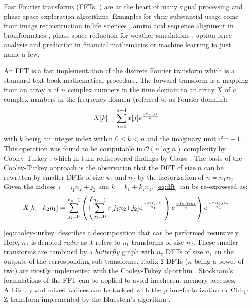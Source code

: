 Fast Fourier transforms (FFTs, \citep{van1992computational}) are at the heart of many signal processing and phase space exploration algorithms. Examples for their substantial usage come from image reconstruction in life sciences \citep{preibisch2014efficient,schmid2015real}, amino acid sequence alignment in bioinformatics \citep{katoh2002mafft}, phase space reduction for weather simulations \citep{maronga2015parallelized}, option price analysis and prediction in financial mathematics \citep{hurd2010fourier} or machine learning \citep{dlstudy} to just name a few.

An FFT is a fast implementation of the discrete Fourier transform which is a standard text-book mathematical procedure. The forward transform is a mapping from an array $x$ of $n$ complex numbers in the time domain to an array $X$ of $n$ complex numbers in the frequency domain (referred to as Fourier domain):
%
\begin{equation}
  \label{eq:dft}
  X[k] = \sum_{j=0}^{n-1} x[j]e^{\frac{-2\pi {\mathrm{i}\mkern1mu} jk}{n}}
\end{equation}
%
with $k$ being an integer index within $0 \le k < n$ and the imaginary unit ${\mathrm{i}\mkern1mu}^2{=}-1$. This operation was found to be computable in $\mathcal{O}(n \log n)$ complexity by Cooley-Turkey \cite{cooley1965algorithm}, which in turn rediscovered findings by Gauss \cite{gauss}. The basis of the Cooley-Turkey approach is the observation that the  DFT of size $n$ can be rewritten by smaller DFTs of size $n_1$ and $n_2$ by the factorization of $n=n_1n_2$. Given the indices $j{=}j_1n_2{+}j_2$ and $k{=}k_1{+}k_2n_1$, \cref{eq:dft} can be re-expressed as:
%
\begin{equation}
  \label{eq:cooley-turkey}
  X[k_1{+}k_2n_1] = \sum_{j_2=0}^{n_2-1} \left( \left( \sum_{j_1=0}^{n_1-1} x[j_1n_2{+}j_2] e^{\frac{-2\pi {\mathrm{i}\mkern1mu} j_1k_1}{n_1}} \right) e^{\frac{-2\pi {\mathrm{i}\mkern1mu} j_2k_1}{n}} \right) e^{\frac{-2\pi {\mathrm{i}\mkern1mu} j_2k_2}{n_2}}
\end{equation}

\cref{eq:cooley-turkey} describes a decomposition that can be performed recursively \cite{FFTW05}. Here, $n_1$ is denoted \emph{radix} as it refers to $n_1$ transforms of size $n_2$. These smaller transforms are combined by a \emph{butterfly} graph with $n_2$ DFTs of size $n_1$ on the outputs of the corresponding sub-transforms. Radix-2 DFTs ($n$ being a power of two) are mostly implemented with the Cooley-Tukey algorithm \cite{cooley1965algorithm}. Stockham's formulations of the FFT can be applied \cite{stockham1966high} to avoid incoherent memory accesses. Arbitrary and mixed radices can be tackled with the prime-factorization or Chirp Z-transform implemented by the Bluestein's algorithm \cite{bluestein}. 


